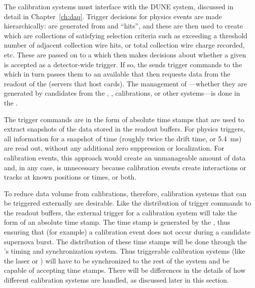 
The calibration systems must interface with the DUNE  system, discussed in detail in Chapter~\ref{ch:daq}.
Trigger decisions for physics events are made %
hierarchically:  are generated from  and  ``hits'', and these  are then used to create  which are collections of  satisfying selection criteria such as exceeding a threshold number of adjacent collection wire hits, or total collection wire charge recorded, etc. These  are passed on to a  which then makes decisions about whether a given  is accepted as a detector-wide trigger.  If so, the  sends trigger commands to the  which in turn passes them to an available  that then requests data from the  readout of the  (servers that host  cards). The management of ---whether they are generated by candidates from the , , calibrations, or other systems---is done in the . 

The trigger commands are in the form of absolute time stamps that are used to extract snapshots of the data stored in the  readout buffers. For physics triggers, all  information for a snapshot of time (roughly twice the drift time, or \SI{5.4}{\milli\s}) are read out, without any additional zero suppression or localization. For calibration events, this approach would create an unmanageable amount of data and, in any case, is unnecessary because calibration events create interactions or tracks at known positions or times, or both.


To reduce data volume from calibrations, therefore, calibration systems that can be triggered externally are desirable. Like the distribution of trigger commands to the  readout buffers, the external trigger for a calibration system will take the form of an absolute time stamp. The time stamp is generated by the , thus ensuring that (for example) a calibration event does not occur during a candidate supernova burst.  The distribution of these time stamps will be done through the 's timing and synchronization system. Thus triggerable calibration systems (like the laser or ) will have to be synchronized to the rest of the  system and be capable of accepting time stamps. There will be differences in the details of how different calibration systems are handled, as discussed later in this section. 

